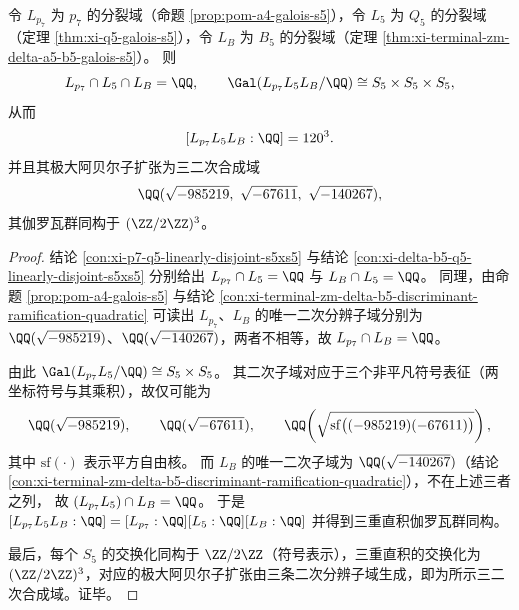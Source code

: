 \begin{conclusion}\label{con:xi-p7-q5-b5-triple-product-s5cube-abelianization}
令 \(L_{p_7}\) 为 \(p_7\) 的分裂域（命题 \ref{prop:pom-a4-galois-s5}），令 \(L_5\) 为 \(Q_5\) 的分裂域（定理 \ref{thm:xi-q5-galois-s5}），令 \(L_B\) 为 \(B_5\) 的分裂域（定理 \ref{thm:xi-terminal-zm-delta-a5-b5-galois-s5}）。
则
\[
L_{p_7}\cap L_5\cap L_B=\QQ,
\qquad
\Gal(L_{p_7}L_5L_B/\QQ)\cong S_5\times S_5\times S_5,
\]
从而
\[
[L_{p_7}L_5L_B:\QQ]=120^3.
\]
并且其极大阿贝尔子扩张为三二次合成域
\[
\QQ(\sqrt{-985219},\ \sqrt{-67611},\ \sqrt{-140267}),
\]
其伽罗瓦群同构于 \((\ZZ/2\ZZ)^3\)。
\end{conclusion}
\begin{proof}
结论 \ref{con:xi-p7-q5-linearly-disjoint-s5xs5} 与结论 \ref{con:xi-delta-b5-q5-linearly-disjoint-s5xs5} 分别给出
\(
L_{p_7}\cap L_5=\QQ
\)
与
\(
L_B\cap L_5=\QQ
\)。
同理，由命题 \ref{prop:pom-a4-galois-s5} 与结论 \ref{con:xi-terminal-zm-delta-b5-discriminant-ramification-quadratic} 可读出 \(L_{p_7}\)、\(L_B\) 的唯一二次分辨子域分别为 \(\QQ(\sqrt{-985219})\)、\(\QQ(\sqrt{-140267})\)，两者不相等，故 \(L_{p_7}\cap L_B=\QQ\)。
\par
由此 \(\Gal(L_{p_7}L_5/\QQ)\cong S_5\times S_5\)。
其二次子域对应于三个非平凡符号表征（两坐标符号与其乘积），故仅可能为
\[
\QQ(\sqrt{-985219}),\qquad
\QQ(\sqrt{-67611}),\qquad
\QQ\!\left(\sqrt{\mathrm{sf}\bigl((-985219)(-67611)\bigr)}\right),
\]
其中 \(\mathrm{sf}(\cdot)\) 表示平方自由核。
而 \(L_B\) 的唯一二次子域为 \(\QQ(\sqrt{-140267})\)（结论 \ref{con:xi-terminal-zm-delta-b5-discriminant-ramification-quadratic}），不在上述三者之列，
故 \((L_{p_7}L_5)\cap L_B=\QQ\)。
于是
\(
[L_{p_7}L_5L_B:\QQ]=[L_{p_7}:\QQ][L_5:\QQ][L_B:\QQ]
\)
并得到三重直积伽罗瓦群同构。
\par
最后，每个 \(S_5\) 的交换化同构于 \(\ZZ/2\ZZ\)（符号表示），三重直积的交换化为 \((\ZZ/2\ZZ)^3\)，对应的极大阿贝尔子扩张由三条二次分辨子域生成，即为所示三二次合成域。证毕。
\end{proof}

